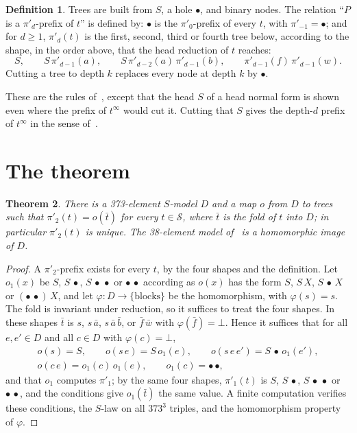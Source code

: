 \documentclass[11pt]{amsart}
\newtheorem{theorem}{Theorem}
\theoremstyle{definition}
\newtheorem{definition}[theorem]{Definition}
\newcommand{\Ter}{\mathcal S}
\newcommand{\hole}{\bullet}
\begin{document}
\begin{definition}\label{def:prefix}
Trees are built from $S$, a hole $\hole$, and binary nodes. The relation ``$P$ is a $\pi'_d$-prefix
of $t$'' is defined by: $\hole$ is the $\pi'_0$-prefix of every $t$, with $\pi'_{-1}=\hole$; and for
$d\ge1$, $\pi'_d(t)$ is the first, second, third or fourth tree below, according to the shape, in the
order above, that the head reduction of $t$ reaches:
\[
S,\qquad S\,\pi'_{d-1}(a),\qquad S\,\pi'_{d-2}(a)\,\pi'_{d-1}(b),\qquad
\pi'_{d-1}(f)\,\pi'_{d-1}(w).
\]
Cutting a tree to depth $k$ replaces every node at depth $k$ by $\hole$.
\end{definition}

\noindent These are the rules of~\citep[Prop.~9]{s3}, except that the head $S$ of a head normal form
is shown even where the prefix of $t^\infty$ would cut it. Cutting that $S$ gives the depth-$d$
prefix of $t^\infty$ in the sense of~\citep{s3}.

\section{The theorem}

\begin{theorem}\label{thm:main}
There is a 373-element $S$-model $D$ and a map $o$ from $D$ to trees such that $\pi'_2(t)=o(\bar t)$
for every $t\in\Ter$, where $\bar t$ is the fold of $t$ into $D$; in particular $\pi'_2(t)$ is
unique. The 38-element model of~\citep{s1} is a homomorphic image of $D$.
\end{theorem}

\begin{proof}
A $\pi'_2$-prefix exists for every $t$, by the four shapes and the definition. Let $o_1(x)$ be
$S$, $S\,\hole$, $S\,\hole\,\hole$ or $\hole\,\hole$ according as $o(x)$ has the form $S$,
$S\,X$, $S\,\hole\,X$ or $(\hole\,\hole)\,X$, and let $\varphi\colon D\to\{\text{blocks}\}$ be
the homomorphism, with $\varphi(s)=s$. The fold is invariant under reduction, so it
suffices to treat the four shapes. In these shapes $\bar t$ is $s$, $s\,\bar a$, $s\,\bar a\,\bar b$,
or $\bar f\,\bar w$ with $\varphi(\bar f)=\bot$. Hence it suffices that for all $e,e'\in D$ and all
$c\in D$ with $\varphi(c)=\bot$,
\begin{gather*}
o(s)=S,\qquad o(s\,e)=S\,o_1(e),\qquad o(s\,e\,e')=S\,\hole\,o_1(e'),\\
o(c\,e)=o_1(c)\,o_1(e),\qquad o_1(c)=\hole\,\hole,
\end{gather*}
and that $o_1$ computes $\pi'_1$; by the same four shapes, $\pi'_1(t)$ is $S$, $S\,\hole$,
$S\,\hole\,\hole$ or $\hole\,\hole$, and the conditions give $o_1(\bar t)$ the same value. A finite computation
verifies these conditions, the $S$-law on all $373^3$ triples, and the homomorphism property of
$\varphi$.
\end{proof}
\end{document}
